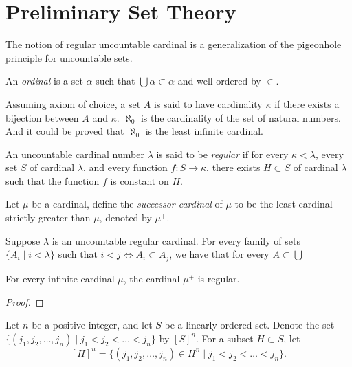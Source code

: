 \newpage
\section{Preliminary Set Theory}
The notion of regular uncountable cardinal is a generalization of the pigeonhole principle for uncountable sets.

\begin{definition}[ordinal]
    An \emph{ordinal} is a set $\alpha$ such that $\bigcup\alpha\subset\alpha$ and well-ordered by $\in$.
\end{definition}

\begin{definition}[cardinal]
    Assuming axiom of choice, a set $A$ is said to have cardinality $\kappa$ if there exists a bijection between $A$ and $\kappa$. $\aleph_0$ is the cardinality of the set of natural numbers. And it could be proved that $\aleph_0$ is the least infinite cardinal.
\end{definition}


\begin{definition}
    An uncountable cardinal number $\lambda$ is said to be \textit{regular} if for every $\kappa<\lambda$, every set $S$ of cardinal $\lambda$, and every function $f:S\to\kappa$, there exists $H\subset S$ of cardinal $\lambda$ such that the function $f$ is constant on $H$.
\end{definition}


\begin{definition}
    Let $\mu$ be a cardinal, define the \emph{successor cardinal} of $\mu$ to be the least cardinal strictly greater than $\mu$, denoted by $\mu^+$.
\end{definition}

\begin{proposition}
    Suppose $\lambda$ is an uncountable regular cardinal. For every family of sets $\{A_i\mid i<\lambda\}$ such that $i<j\iff A_i\subset A_j$, we have that for every $A\subset \bigcup_{}$
\end{proposition}
\begin{proposition}
    For every infinite cardinal $\mu$, the cardinal $\mu^+$ is regular.
\end{proposition}
\begin{proof}
    
\end{proof}


\begin{notation}
    Let $n$ be a positive integer, and let $S$ be a linearly ordered set. Denote the set $\{(j_1, j_2, \ldots, j_n)\mid j_1<j_2<\ldots<j_n\}$ by $[S]^n$. For a subset $H\subset S$, let
    \[
        [H]^n=\{(j_1, j_2, \ldots, j_n)\in H^n\mid j_1<j_2<\ldots<j_n\}.
    \]
\end{notation}

